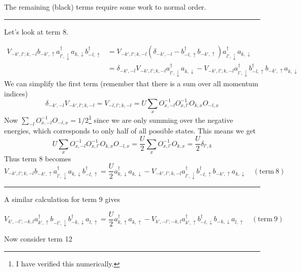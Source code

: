 \documentclass[
  letterpaper,
  DIV=11,
  numbers=noendperiod]{scrartcl}
\begin{document}
The remaining (black) terms require some work to normal order.

\begin{center}\rule{0.5\linewidth}{0.5pt}\end{center}

Let's look at term 8.

\begin{align}
V_{-k',l';k,-l}b^{}_{-k',\uparrow}a^\dagger_{l',\downarrow}a^{}_{k,\downarrow}b^\dagger_{-l,\uparrow}&=V_{-k',l';k,-l}\left(\delta_{-k',-l}-b^\dagger_{-l,\uparrow}b^{}_{-k',\uparrow}\right)a^\dagger_{l',\downarrow}a^{}_{k,\downarrow}\\
&=\delta_{-k',-l}V_{-k',l';k,-l}a^\dagger_{l',\downarrow}a^{}_{k,\downarrow}-V_{-k',l';k,-l}a^\dagger_{l',\downarrow}b^\dagger_{-l,\uparrow}b^{}_{-k',\uparrow}a^{}_{k,\downarrow}
\end{align}
We can simplify the first term (remember that there is a sum over all
momentum indices) \[
\delta_{-k',-l}V_{-k',l';k,-l}=V_{-l,l';k,-l}=U\sum_xO^{-1}_{x,-l}O^{-1}_{x,l'}O^{}_{k,x}O^{}_{-l,x}
\] Now \(\sum_{-l}O^{-1}_{x,-l}O^{}_{-l,x}=1/2\)\footnote{I have
  verified this numerically.} since we are only summing over the
negative energies, which corresponds to only half of all possible
states. This means we get \[
U\sum_xO^{-1}_{x,-l}O^{-1}_{x,l'}O^{}_{k,x}O^{}_{-l,x}=\frac{U}{2}\sum_xO^{-1}_{x,l'}O^{}_{k,x}=\frac{U}{2}\delta_{l',k}
\] Thus term 8 becomes \[
V_{-k',l';k,-l}b^{}_{-k',\uparrow}a^\dagger_{l',\downarrow}a^{}_{k,\downarrow}b^\dagger_{-l,\uparrow}
=\frac{U}{2}a^\dagger_{k,\downarrow}a^{}_{k,\downarrow}-V_{-k',l';k,-l}a^\dagger_{l',\downarrow}b^\dagger_{-l,\uparrow}b^{}_{-k',\uparrow}a^{}_{k,\downarrow}\quad\operatorname{(term\ 8)}
\]

\begin{center}\rule{0.5\linewidth}{0.5pt}\end{center}

A similar calculation for term 9 gives

\[
V_{k',-l';-k,l}a^\dagger_{k',\uparrow}b^{}_{-l',\downarrow}b^\dagger_{-k,\downarrow}a^{}_{l,\uparrow}
=\frac{U}{2}a^\dagger_{k,\uparrow}a^{}_{k,\uparrow}-V_{k',-l';-k,l}a^\dagger_{k',\uparrow}b^\dagger_{-l,\downarrow}b^{}_{-k,\downarrow}a^{}_{l,\uparrow}\quad\operatorname{(term\ 9)}
\]

Now consider term 12
\end{document}
